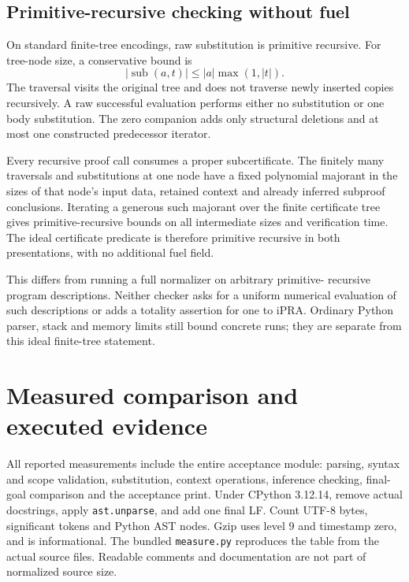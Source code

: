 \subsection{Primitive-recursive checking without fuel}

On standard finite-tree encodings, raw substitution is primitive recursive.
For tree-node size, a conservative bound is
\[
                |\operatorname{sub}(a,t)|
                \le |a|\max(1,|t|).
\]
The traversal visits the original tree and does not traverse newly inserted
copies recursively. A raw successful evaluation performs either no
substitution or one body substitution. The zero companion adds only
structural deletions and at most one constructed predecessor iterator.

Every recursive proof call consumes a proper subcertificate. The finitely
many traversals and substitutions at one node have a fixed polynomial
majorant in the sizes of that node's input data, retained context and
already inferred subproof conclusions. Iterating a generous such majorant
over the finite certificate tree gives primitive-recursive bounds on all
intermediate sizes and verification time. The ideal certificate predicate
is therefore primitive recursive in both presentations, with no additional
fuel field.

This differs from running a full normalizer on arbitrary primitive-
recursive program descriptions. Neither checker asks for a uniform numerical
evaluation of such descriptions or adds a totality assertion for one to
iPRA. Ordinary Python parser, stack and memory limits still bound concrete
runs; they are separate from this ideal finite-tree statement.

\section{Measured comparison and executed evidence}
\label{sec:metrics}

All reported measurements include the entire acceptance module: parsing,
syntax and scope validation, substitution, context operations, inference
checking, final-goal comparison and the acceptance print. Under CPython
3.12.14, remove actual docstrings, apply \texttt{ast.unparse}, and add one
final LF. Count UTF-8 bytes, significant tokens and Python AST nodes.
Gzip uses level $9$ and timestamp zero, and is informational.
The bundled \texttt{measure.py} reproduces the table from the actual source
files. Readable comments and documentation are not part of normalized
source size.

